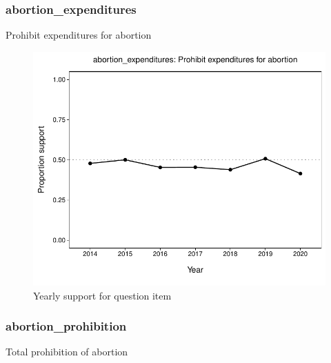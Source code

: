 \documentclass[
  12pt]{article}
\begin{document}
\hypertarget{abortion_expenditures}{%
\subsubsection{abortion\_expenditures}\label{abortion_expenditures}}

Prohibit expenditures for abortion

\begin{figure}

{\centering \includegraphics{error-checking_files/figure-latex/unnamed-chunk-3-5} 

}

\caption{Yearly support for question item}\label{fig:unnamed-chunk-3-5}
\end{figure}

\hypertarget{abortion_prohibition}{%
\subsubsection{abortion\_prohibition}\label{abortion_prohibition}}

Total prohibition of abortion
\end{document}
